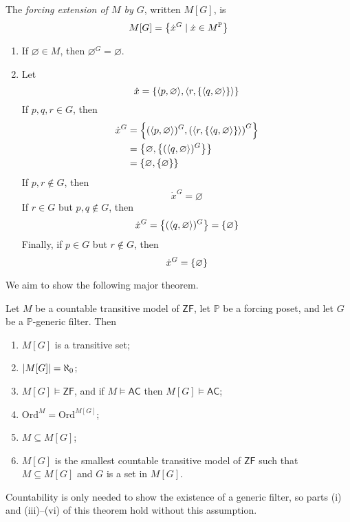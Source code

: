 \begin{definition}
    The \emph{forcing extension of \( M \) by \( G \)}, written \( M[G] \), is
    \[ M[G] = \qty{\dot x^G \mid \dot x \in M^{\mathbb P}} \]
\end{definition}
\begin{example}
    \begin{enumerate}
        \item If \( \varnothing \in M \), then \( \varnothing^G = \varnothing \).
        \item Let
        \[ \dot x = \qty{\langle p, \varnothing \rangle, \langle r, \qty{\langle q, \varnothing \rangle} \rangle} \]
        If \( p, q, r \in G \), then
        \begin{align*}
            \dot x^G &= \qty{(\langle p, \varnothing \rangle)^G, \qty(\langle r, \qty{\langle q, \varnothing \rangle} \rangle)^G} \\
            &= \qty{\varnothing, \qty{(\langle q, \varnothing \rangle)^G}} \\
            &= \qty{\varnothing, \qty{\varnothing}}
        \end{align*}
        If \( p, r \notin G \), then
        \[ \dot x^G = \varnothing \]
        If \( r \in G \) but \( p, q \notin G \), then
        \[ \dot x^G = \qty{(\langle q, \varnothing \rangle)^G} = \qty{\varnothing} \]
        Finally, if \( p \in G \) but \( r \notin G \), then
        \[ \dot x^G = \qty{\varnothing} \]
    \end{enumerate}
\end{example}
We aim to show the following major theorem.
\begin{theorem}
    Let \( M \) be a countable transitive model of \( \mathsf{ZF} \), let \( \mathbb P \) be a forcing poset, and let \( G \) be a \( \mathbb P \)-generic filter.
    Then
    \begin{enumerate}
        \item \( M[G] \) is a transitive set;
        \item \( \abs{M[G]} = \aleph_0 \);
        \item \( M[G] \vDash \mathsf{ZF} \), and if \( M \vDash \mathsf{AC} \) then \( M[G] \vDash \mathsf{AC} \);
        \item \( \mathrm{Ord}^M = \mathrm{Ord}^{M[G]} \);
        \item \( M \subseteq M[G] \);
        \item \( M[G] \) is the smallest countable transitive model of \( \mathsf{ZF} \) such that \( M \subseteq M[G] \) and \( G \) is a set in \( M[G] \).
    \end{enumerate}
\end{theorem}
Countability is only needed to show the existence of a generic filter, so parts (i) and (iii)--(vi) of this theorem hold without this assumption.

